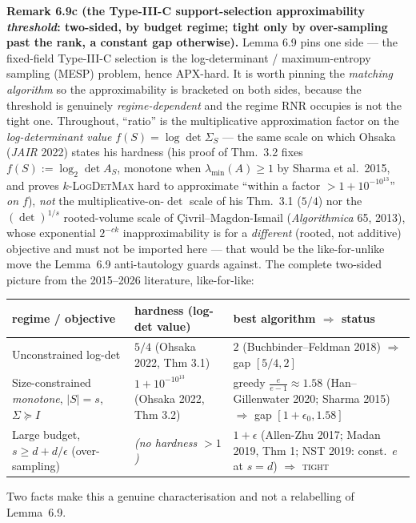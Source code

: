 \documentclass[
]{article}
\begin{document}
\textbf{Remark 6.9c (the Type-III-C support-selection approximability
\emph{threshold}: two-sided, by budget regime; tight only by over-sampling
past the rank, a constant gap otherwise).} Lemma 6.9 pins one side --- the
fixed-field Type-III-C selection is the log-determinant / maximum-entropy
sampling (MESP) problem, hence APX-hard. It is worth pinning the
\emph{matching algorithm} so the approximability is bracketed on both sides,
because the threshold is genuinely \emph{regime-dependent} and the regime RNR
occupies is not the tight one. Throughout, ``ratio'' is the multiplicative
approximation factor on the \emph{log-determinant value} $f(S)=\log\det
\Sigma_S$ --- the same scale on which Ohsaka (\emph{JAIR} 2022) states his
hardness (his proof of Thm.\ 3.2 fixes $f(S):=\log_2\det A_S$, monotone when
$\lambda_{\min}(A)\ge 1$ by Sharma et al.\ 2015, and proves $k$-\textsc{LogDetMax}
hard to approximate ``within a factor $>1+10^{-10^{13}}$'' \emph{on $f$}),
\emph{not} the multiplicative-on-$\det$ scale of his Thm.\ 3.1 ($5/4$) nor the
$(\det)^{1/s}$ rooted-volume scale of \c{C}ivril--Magdon-Ismail
(\emph{Algorithmica} 65, 2013), whose exponential $2^{-ck}$ inapproximability
is for a \emph{different} (rooted, not additive) objective and must not be
imported here --- that would be the like-for-unlike move the Lemma~6.9
anti-tautology guards against. The complete two-sided picture from the
2015--2026 literature, like-for-like:
\begingroup\footnotesize\sloppy
\setlength{\tabcolsep}{5pt}
\noindent\begin{tabular}{@{}p{3.7cm}p{3.6cm}p{4.7cm}@{}}
\hline
\textbf{regime / objective} & \textbf{hardness (log-det value)} &
\textbf{best algorithm $\Rightarrow$ status}\\
\hline
Unconstrained log-det
& $5/4$ (Ohsaka 2022, Thm 3.1)
& $2$ (Buchbinder--Feldman 2018) $\Rightarrow$ gap $[5/4,2]$\\
Size-constrained \emph{monotone}, $|S|{=}s$, $\Sigma\succeq I$
& $1+10^{-10^{13}}$ (Ohsaka 2022, Thm 3.2)
& greedy $\tfrac{e}{e-1}\!\approx\!1.58$ (Han--Gillenwater 2020;
Sharma 2015) $\Rightarrow$ gap $[1{+}\epsilon_0,1.58]$\\
Large budget, $s\ge d+d/\epsilon$ (over-sampling)
& \emph{(no hardness $>1$)}
& $1+\epsilon$ (Allen-Zhu 2017; Madan 2019, Thm 1; NST 2019:
const.\ $e$ at $s{=}d$) $\Rightarrow$ \textsc{tight}\\
\hline
\end{tabular}
\par\endgroup
Two facts make this a genuine characterisation and not a relabelling of
Lemma~6.9.
\end{document}
